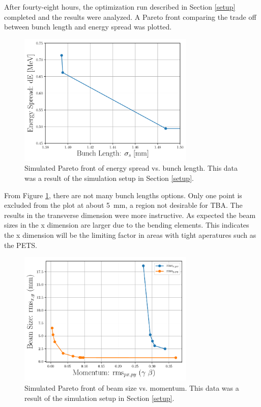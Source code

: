 After fourty-eight hours, the optimization run described in Section \ref{setup}
completed and the results were analyzed. 
A Pareto front comparing the trade off between bunch length and energy spread was plotted.
\begin{figure}
	\centering
	\includegraphics[width=0.75\textwidth]{./images/dE_vs_zrms_pareto_front_quads_before_Q5}
	\caption{Simulated Pareto front of energy spread vs. bunch length.
	This data was a result of the simulation setup in Section \ref{setup}.}
\label{fig:tba-pareto}
\end{figure}
From Figure \ref{fig:tba-pareto}, there are not many bunch lengths options.
Only one point is excluded from the plot at about \SI{5}{mm}, a region 
not desirable for TBA. The results in the transverse dimension were
more instructive. As expected the beam sizes in the x dimension are larger 
due to the bending elements. This indicates the x dimension will be the 
limiting factor in areas with tight aperatures such as the PETS.
\begin{figure}
	\centering
	\includegraphics[width=0.75\textwidth]{./images/xy_vs_pxy_pareto_front_quads_before_Q5}
	\caption{Simulated Pareto front of beam size vs. momentum.
		This data was a result of the simulation setup in Section \ref{setup}.}
	\label{fig:tba-paretoxy}
\end{figure}

